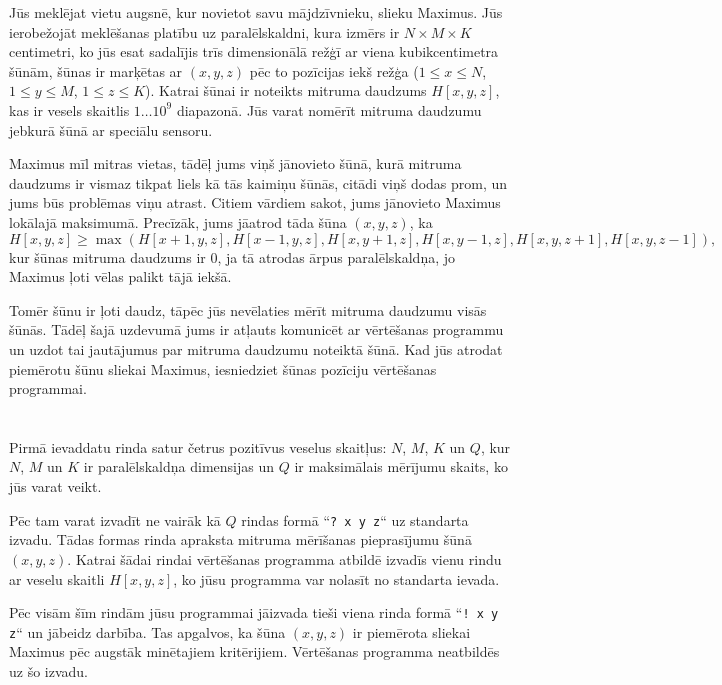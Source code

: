 \ifx\boi\undefined\fi
\def\version{jury-1}

Jūs meklējat vietu augsnē, kur novietot savu mājdzīvnieku, slieku Maximus.
Jūs ierobežojāt meklēšanas platību uz paralēlskaldni, kura izmērs ir $N \times M \times K$ centimetri,
ko jūs esat sadalījis trīs dimensionālā režģī ar viena kubikcentimetra šūnām,
šūnas ir marķētas ar $(x, y, z)$ pēc to pozīcijas iekš režģa ($1 \le x \le N$, $1 \le y \le M$, $1 \le z \le K$).
Katrai šūnai ir noteikts mitruma daudzums $H[x,y,z]$, kas ir vesels skaitlis $1 \dots 10^9$ diapazonā.
Jūs varat nomērīt mitruma daudzumu jebkurā šūnā ar speciālu sensoru.

Maximus mīl mitras vietas, tādēļ jums viņš jānovieto šūnā, kurā mitruma daudzums ir vismaz tikpat liels kā tās kaimiņu šūnās,
citādi viņš dodas prom, un jums būs problēmas viņu atrast.
Citiem vārdiem sakot, jums jānovieto Maximus lokālajā maksimumā.
Precīzāk, jums jāatrod tāda šūna $(x,y,z)$, ka
$$
H[x,y,z] \ge \max(H[x+1,y,z], H[x-1,y,z], H[x,y+1,z], H[x,y-1,z], H[x,y,z+1], H[x,y,z-1]),
$$
kur šūnas mitruma daudzums ir $0$, ja tā atrodas ārpus paralēlskaldņa, jo Maximus ļoti vēlas palikt tājā iekšā.

Tomēr šūnu ir ļoti daudz, tāpēc jūs nevēlaties mērīt mitruma daudzumu visās šūnās.
Tādēļ šajā uzdevumā jums ir atļauts komunicēt ar vērtēšanas programmu un uzdot tai jautājumus par mitruma daudzumu noteiktā šūnā.
Kad jūs atrodat piemērotu šūnu sliekai Maximus, iesniedziet šūnas pozīciju vērtēšanas programmai.

\section*{\interactivity}
Pirmā ievaddatu rinda satur četrus pozitīvus veselus skaitļus: $N$, $M$, $K$ un $Q$,
kur $N$, $M$ un $K$ ir paralēlskaldņa dimensijas un $Q$ ir maksimālais mērījumu skaits, ko jūs varat veikt.

Pēc tam varat izvadīt ne vairāk kā $Q$ rindas formā ``\texttt{?\ x y z}`` uz standarta izvadu.
Tādas formas rinda apraksta mitruma mērīšanas pieprasījumu šūnā $(x, y, z)$.
Katrai šādai rindai vērtēšanas programma atbildē izvadīs vienu rindu ar veselu skaitli $H[x,y,z]$,
ko jūsu programma var nolasīt no standarta ievada.

Pēc visām šīm rindām jūsu programmai jāizvada tieši viena rinda formā ``\texttt{!\ x y z}`` un jābeidz darbība.
Tas apgalvos, ka šūna $(x, y, z)$ ir piemērota sliekai Maximus pēc augstāk minētajiem kritērijiem.
Vērtēšanas programma neatbildēs uz šo izvadu.

